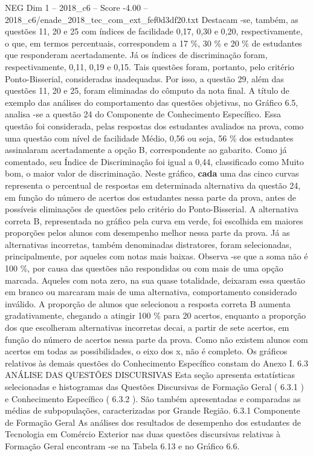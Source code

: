 \begin{textsample}{NEG Dim 1 – 2018\_c6 – Score -4.00 – 2018\_c6/enade\_2018\_tec\_com\_ext\_fef0d3df20.txt}
Destacam -se, também, as questões 11, 20 e 25 com índices de facilidade 0,17, 0,30 e 0,20, respectivamente, o que, em termos percentuais, correspondem a 17 \%, 30 \% e 20 \% de estudantes que responderam acertadamente.
Já os índices de discriminação foram, respectivamente, 0,11, 0,19 e 0,15.
Tais questões foram, portanto, pelo critério Ponto-Bisserial, consideradas inadequadas.
Por isso, a questão 29, além das questões 11, 20 e 25, foram eliminadas do cômputo da nota final.
A título de exemplo das análises do comportamento das questões objetivas, no Gráfico 6.5, analisa -se a questão 24 do Componente de Conhecimento Específico.
Essa questão foi considerada, pelas respostas dos estudantes avaliados na prova, como uma questão com nível de facilidade Médio, 0,56 ou seja, 56 \% dos estudantes assinalaram acertadamente a opção B, correspondente ao gabarito.
Como já comentado, seu Índice de Discriminação foi igual a 0,44, classificado como Muito bom, o maior valor de discriminação.
Neste gráfico, \textbf{cada} uma das cinco curvas representa o percentual de respostas em determinada alternativa da questão 24, em função do número de acertos dos estudantes nessa parte da prova, antes de possíveis eliminações de questões pelo critério do Ponto-Bisserial.
A alternativa correta B, representada no gráfico pela curva em verde, foi escolhida em maiores proporções pelos alunos com desempenho melhor nessa parte da prova.
Já as alternativas incorretas, também denominadas distratores, foram selecionadas, principalmente, por aqueles com notas mais baixas.
Observa -se que a soma não é 100 \%, por causa das questões não respondidas ou com mais de uma opção marcada.
Aqueles com nota zero, na sua quase totalidade, deixaram essa questão em branco ou marcaram mais de uma alternativa, comportamento considerado inválido.
A proporção de alunos que selecionou a resposta correta B aumenta gradativamente, chegando a atingir 100 \% para 20 acertos, enquanto a proporção dos que escolheram alternativas incorretas decai, a partir de sete acertos, em função do número de acertos nessa parte da prova.
Como não existem alunos com acertos em todas as possibilidades, o eixo dos x, não é completo.
Os gráficos relativos às demais questões do Conhecimento Específico constam do Anexo I. 6.3 ANÁLISE DAS QUESTÕES DISCURSIVAS Esta seção apresenta estatísticas selecionadas e histogramas das Questões Discursivas de Formação Geral ( 6.3.1 ) e Conhecimento Específico ( 6.3.2 ).
São também apresentadas e comparadas as médias de subpopulações, caracterizadas por Grande Região. 6.3.1 Componente de Formação Geral As análises dos resultados de desempenho dos estudantes de Tecnologia em Comércio Exterior nas duas questões discursivas relativas à Formação Geral encontram -se na Tabela 6.13 e no Gráfico 6.6.

\end{textsample}
